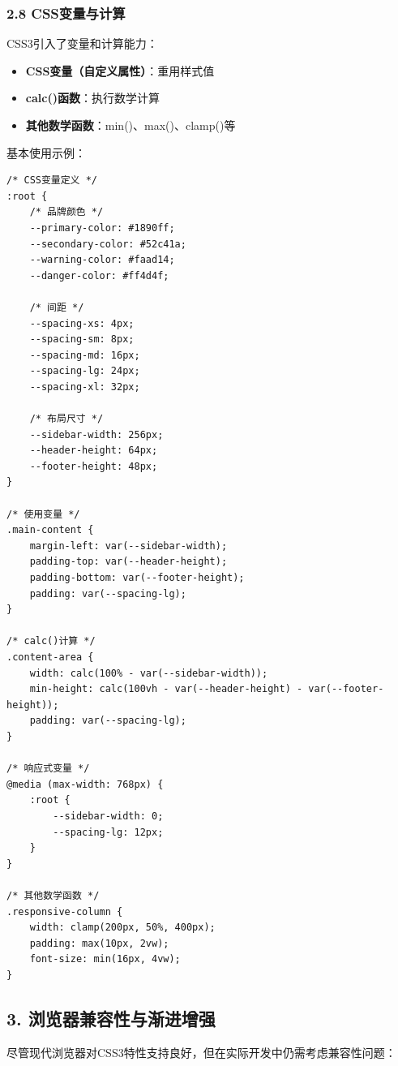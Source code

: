 \subsubsection{2.8
CSS变量与计算}\label{cssux53d8ux91cfux4e0eux8ba1ux7b97}

CSS3引入了变量和计算能力：

\begin{itemize}
\tightlist
\item
  \textbf{CSS变量（自定义属性）}：重用样式值
\item
  \textbf{calc()函数}：执行数学计算
\item
  \textbf{其他数学函数}：min()、max()、clamp()等
\end{itemize}

基本使用示例：

\begin{lstlisting}
/* CSS变量定义 */
:root {
    /* 品牌颜色 */
    --primary-color: #1890ff;
    --secondary-color: #52c41a;
    --warning-color: #faad14;
    --danger-color: #ff4d4f;
    
    /* 间距 */
    --spacing-xs: 4px;
    --spacing-sm: 8px;
    --spacing-md: 16px;
    --spacing-lg: 24px;
    --spacing-xl: 32px;
    
    /* 布局尺寸 */
    --sidebar-width: 256px;
    --header-height: 64px;
    --footer-height: 48px;
}

/* 使用变量 */
.main-content {
    margin-left: var(--sidebar-width);
    padding-top: var(--header-height);
    padding-bottom: var(--footer-height);
    padding: var(--spacing-lg);
}

/* calc()计算 */
.content-area {
    width: calc(100% - var(--sidebar-width));
    min-height: calc(100vh - var(--header-height) - var(--footer-height));
    padding: var(--spacing-lg);
}

/* 响应式变量 */
@media (max-width: 768px) {
    :root {
        --sidebar-width: 0;
        --spacing-lg: 12px;
    }
}

/* 其他数学函数 */
.responsive-column {
    width: clamp(200px, 50%, 400px);
    padding: max(10px, 2vw);
    font-size: min(16px, 4vw);
}
\end{lstlisting}

\subsection{3.
浏览器兼容性与渐进增强}\label{ux6d4fux89c8ux5668ux517cux5bb9ux6027ux4e0eux6e10ux8fdbux589eux5f3a}

尽管现代浏览器对CSS3特性支持良好，但在实际开发中仍需考虑兼容性问题：

